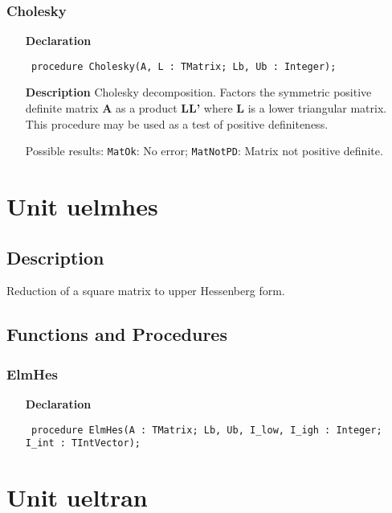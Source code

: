 \documentclass[12pt,a4paper,oneside]{report}
\newcommand{\declarationitem}[1]{\textbf{#1}}
\newcommand{\descriptiontitle}[1]{\textbf{#1}}
\newcommand{\code}[1]{\texttt{#1}}
\begin{document}
\subsubsection{Cholesky}
\label{ucholesk-Cholesky}
\begin{itemize}\item[\declarationitem{Declaration}\hfill]
	\begin{flushleft}
		\code{
			procedure Cholesky(A, L : TMatrix; Lb, Ub : Integer);}
		
	\end{flushleft}
	
	\par
	\item[\descriptiontitle{Description}]
	Cholesky decomposition. Factors the symmetric positive definite matrix \textbf{A} as a product \textbf{LL'} where \textbf{L} is a lower triangular matrix. This procedure may be used as a test of positive definiteness.
	
	Possible results: \code{MatOk}: No error; \code{MatNotPD}: Matrix not positive definite.
	
\end{itemize}

\section{Unit uelmhes}
\label{uelmhes}
\subsection{Description}
Reduction of a square matrix to upper Hessenberg form. 
\subsection{Functions and Procedures}
\subsubsection{ElmHes}
\label{uelmhes-ElmHes}
\begin{itemize}\item[\declarationitem{Declaration}\hfill]
	\begin{flushleft}
		\code{
			procedure ElmHes(A : TMatrix; Lb, Ub, I{\_}low, I{\_}igh : Integer; I{\_}int : TIntVector);}
	\end{flushleft}
\end{itemize}
\section{Unit ueltran}
\label{ueltran}
\end{document}
